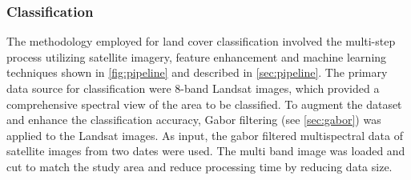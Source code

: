 \documentclass[12pt,a4paper, english,twoside]{scrartcl}
\begin{document}
    \subsubsection{Classification }\label{sec:classification}
      The methodology employed for land cover classification involved the multi-step process utilizing satellite imagery, feature enhancement and machine learning techniques shown in \cref{fig:pipeline} and described in \cref{sec:pipeline}.
      The primary data source for classification were 8-band Landsat images, which provided a comprehensive spectral view of the area to be classified.
      To augment the dataset and enhance the classification accuracy, Gabor filtering (see \cref{sec:gabor}) was applied to the Landsat images.
      As input, the gabor filtered multispectral data of satellite images from two dates were used.
      The multi band image was loaded and cut to match the study area and reduce processing time by reducing data size.  
\end{document}
